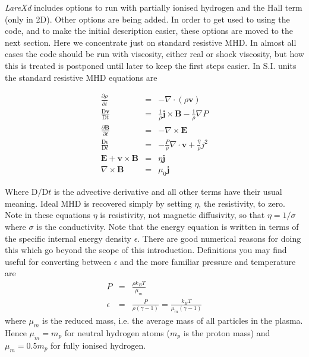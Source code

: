 \documentclass[11pt]{article}
\begin{document}
{\it LareXd} includes options to run with partially ionised hydrogen and the Hall term (only in 2D). Other options are being added. In order to get used to using the code, and to make the initial description easier, these options are moved to the next section. Here we concentrate just on standard resistive MHD. In almost all cases the code should be run with viscosity, either real or shock viscosity, but how this is treated is postponed until later to keep the first steps easier. In S.I. units the standard resistive MHD equations are

\begin{eqnarray}
\frac{\partial \rho}{\partial t}&=&- \nabla\cdot(\rho \mathbf{v})\\
\frac{\mathrm{D}\mathbf{v}}{\mathrm{D}t}&=&\frac{1}{\rho}\mathbf{j}\times\mathbf{B}
-\frac{1}{\rho}\nabla P\\
\frac{\partial \mathbf{B}}{\partial t}&=&-\nabla\times\mathbf{E} \label{faraday}\\
\frac{\mathrm{D}\epsilon}{\mathrm{D}t}&=&-\frac{P}{\rho}\nabla\cdot\mathbf{v}+\frac
{\eta}{\rho}j^{2}\\
\mathbf{E}+\mathbf{v}\times\mathbf{B}&=&\eta \mathbf{j} \label{ohm}\\
\nabla\times\mathbf{B}&=&\mu_0 \mathbf{j}
\end{eqnarray}

Where $\mathrm{D}/\mathrm{D}t$ is the advective derivative and all other terms have their usual meaning. Ideal MHD is recovered simply by setting $\eta$, the resistivity, to zero. Note in these equations $\eta$ is resistivity, not magnetic diffusivity, so that $\eta=1/\sigma$ where $\sigma$ is the conductivity. Note that the energy equation is written in terms of the specific internal energy density $\epsilon$. There are good numerical reasons for doing this which go beyond the scope of this introduction. Definitions you may find useful for converting between $\epsilon$ and the more familiar pressure and temperature are
\begin{eqnarray*}
P&=&\frac{\rho k_{B}T}{\mu_m}\\
\epsilon&=&\frac{P}{\rho(\gamma-1)}=\frac{k_B T}{\mu_m (\gamma-1)}
\end{eqnarray*}
where $\mu_m$ is the reduced mass, i.e. the average mass of all particles in the plasma. Hence $\mu_m=m_p$ for neutral hydrogen atoms ($m_p$ is the proton mass) and $\mu_m=0.5 m_p$ for fully ionised hydrogen.
\end{document}
